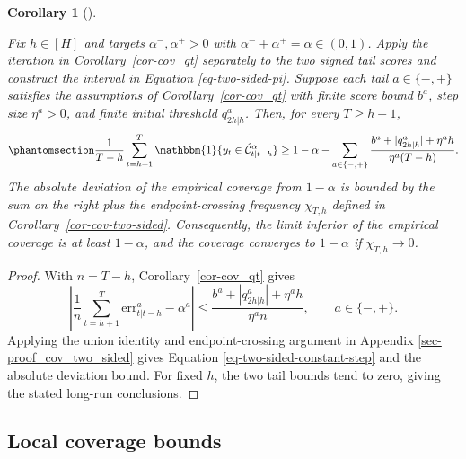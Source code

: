 \documentclass[
  american,
  12pt]{article}
\theoremstyle{plain}
\newtheorem{corollary}{Corollary}[section]
\theoremstyle{plain}
\theoremstyle{remark}
\begin{document}
\begin{corollary}[]\protect\hypertarget{cor-cov-two-sided-qt}{}\label{cor-cov-two-sided-qt}

Fix \(h\in[H]\) and targets \(\alpha^{-},\alpha^{+}>0\) with
\(\alpha^{-}+\alpha^{+}=\alpha\in(0,1)\). Apply the iteration in
Corollary~\ref{cor-cov_qt} separately to the two signed tail scores and
construct the interval in Equation \eqref{eq-two-sided-pi}. Suppose each
tail \(a\in\{-,+\}\) satisfies the assumptions of
Corollary~\ref{cor-cov_qt} with finite score bound \(b^a\), step size
\(\eta^a>0\), and finite initial threshold \(q^a_{2h|h}\). Then, for
every \(T\geq h+1\),
\begin{equation}\phantomsection\label{eq-two-sided-constant-step}{
\frac{1}{T-h}\sum_{t=h+1}^{T}\mathbbm{1}\{y_t\in\hat{\mathcal C}_{t|t-h}^{\alpha}\}
\geq 1-\alpha-\sum_{a\in\{-,+\}}\frac{b^a+|q^a_{2h|h}|+\eta^a h}{\eta^a(T-h)}.
}\end{equation} The absolute deviation of the empirical coverage from
\(1-\alpha\) is bounded by the sum on the right plus the
endpoint-crossing frequency \(\chi_{T,h}\) defined in
Corollary~\ref{cor-cov-two-sided}. Consequently, the limit inferior of
the empirical coverage is at least \(1-\alpha\), and the coverage
converges to \(1-\alpha\) if \(\chi_{T,h}\to0\).

\end{corollary}

\begin{proof}
With \(n=T-h\), Corollary~\ref{cor-cov_qt} gives \[
\left|\frac1n\sum_{t=h+1}^{T}\mathrm{err}_{t|t-h}^{a}-\alpha^a\right|
\leq\frac{b^a+|q^a_{2h|h}|+\eta^a h}{\eta^a n},\qquad a\in\{-,+\}.
\] Applying the union identity and endpoint-crossing argument in
Appendix \ref{sec-proof_cov_two_sided} gives Equation
\eqref{eq-two-sided-constant-step} and the absolute deviation bound. For
fixed \(h\), the two tail bounds tend to zero, giving the stated
long-run conclusions.
\end{proof}

\subsection{Local coverage bounds}\label{sec-local-coverage}
\end{document}
